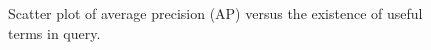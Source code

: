\begin{figure}[t!]
\begin{centering}
egraphics[width=6.5cm]{figs/greaterthan10-p.eps}}
\par\end{centering}

\protect\caption{Scatter plot of average precision (AP) versus the existence of useful terms in query.}
\label{fig:overlap-p}
\end{figure}
